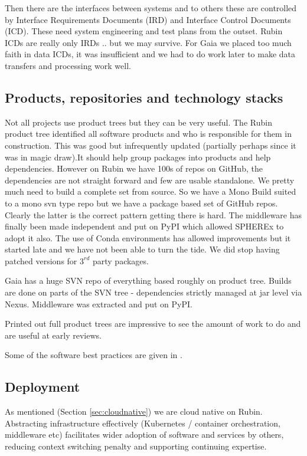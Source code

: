 \documentclass[11pt,twoside]{article}
\begin{document}
Then there are the interfaces between systems and to others these are controlled by Interface Requirements Documents (IRD) and Interface Control Documents (ICD).
These need system engineering and test plans from the outset.
Rubin ICDs are really only IRDs .. but we may survive.
For Gaia  we placed too much faith in data ICDs, it was insufficient and we had to do work later to make data transfers and processing work well.



\subsection{Products, repositories and technology stacks}
Not all projects use product trees but they can be very useful.
The Rubin product tree identified all  software products  and who is responsible for them in construction.
This was good but infrequently updated (partially perhaps since it was in magic draw).It should help group packages into products and help dependencies.
However on Rubin we have 100s of repos on GitHub, the dependencies are not straight forward and few are usable standalone.
We pretty much need to build a complete set from source.
So we have a Mono Build suited to a mono svn type repo but we have a package based set of GitHub repos.
Clearly the latter is the correct pattern getting there is hard.
The middleware has finally been made independent and put on PyPI which allowed SPHEREx to adopt it also.
The use of Conda environments has allowed improvements but it started late and we have not been able to turn the tide.
We did stop having patched versions for $3^{rd}$ party packages.

Gaia has a huge SVN repo of everything based roughly on product tree.  Builds are done on parts of the SVN tree - dependencies strictly managed at jar level via Nexus.
Middleware was extracted and put on PyPI.

Printed out full product trees are impressive to see the amount of work to do and are useful at early reviews.

Some of the software best practices are given in \citet{2018SPIE10707E..09J}.

\subsection{Deployment}
As mentioned (Section \ref{sec:cloudnative}) we are cloud native on Rubin.
Abstracting infrastructure effectively (Kubernetes / container orchestration, middleware etc) facilitates wider adoption of software and services by others, reducing context switching penalty and supporting continuing expertise.
\end{document}

